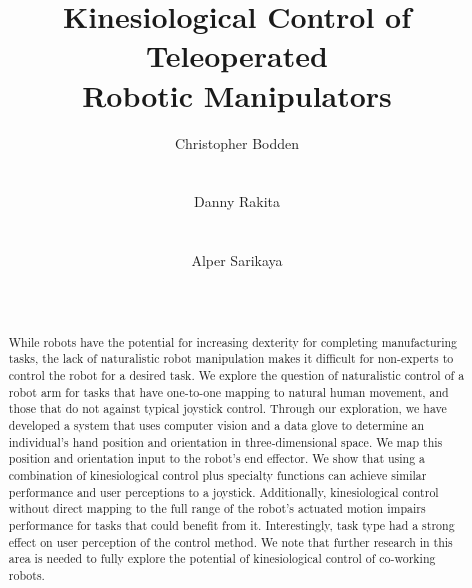 \documentclass{sigchi}
\begin{document}
\title{Kinesiological Control of Teleoperated \\Robotic Manipulators}

\author{
  \alignauthor Christopher Bodden\\
    \\
    \\
  \alignauthor Danny Rakita\\
    \\
    \\
  \alignauthor Alper Sarikaya\\
    \\
    \\
}

\maketitle

\begin{abstract}
While robots have the potential for increasing dexterity for completing manufacturing tasks, the lack of naturalistic robot manipulation makes it difficult for non-experts to control the robot for a desired task. We explore the question of naturalistic control of a robot arm for tasks that have one-to-one mapping to natural human movement, and those that do not against typical joystick control. Through our exploration, we have developed a system that uses computer vision and a data glove to determine an individual's hand position and orientation in three-dimensional space. We map this position and orientation input to the robot's end effector. We show that using a combination of kinesiological control plus specialty functions can achieve similar performance and user perceptions to a joystick. Additionally, kinesiological control without direct mapping to the full range of the robot's actuated motion impairs performance for tasks that could benefit from it. Interestingly, task type had a strong effect on user perception of the control method. We note that further research in this area is needed to fully explore the potential of kinesiological control of co-working robots.
\end{abstract}
\end{document}
